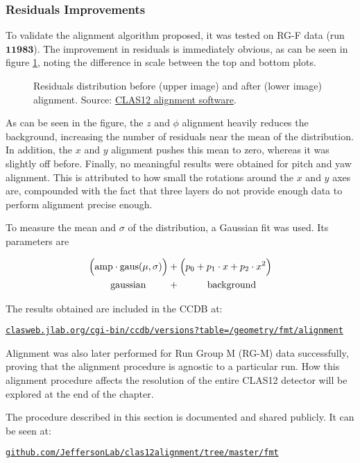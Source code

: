 \subsubsection{Residuals Improvements}
    To validate the alignment algorithm proposed, it was tested on RG-F data (run $\mathbf{11983}$).
    The improvement in residuals is immediately obvious, as can be seen in figure \ref{fig::res_comparison}, noting the difference in scale between the top and bottom plots.

    \begin{figure}[t!]
        \centering{}
        \caption[Residuals distribution improvement.]{Residuals distribution before (upper image) and after (lower image) alignment.
        Source: \hyperlink{github.com/JeffersonLab/clas12alignment}{CLAS12 alignment software}.}
        \label{fig::res_comparison}
    \end{figure}

    As can be seen in the figure, the $z$ and $\phi$ alignment heavily reduces the background, increasing the number of residuals near the mean of the distribution.
    In addition, the $x$ and $y$ alignment pushes this mean to zero, whereas it was slightly off before.
    Finally, no meaningful results were obtained for pitch and yaw alignment.
    This is attributed to how small the rotations around the $x$ and $y$ axes are, compounded with the fact that three layers do not provide enough data to perform alignment precise enough.

    To measure the mean and $\sigma$ of the distribution, a Gaussian fit was used.
    Its parameters are

     \begin{align*}
        \Big( \text{amp} \cdot \text{gaus}(\mu, \sigma) \Big) &+ \Big( p_0 + p_1\cdot x + p_2\cdot x^2 \Big) \\
        \text{gaussian} \hspace{0.8cm} &+ \hspace{1cm} \text{background}
    \end{align*}

    The results obtained are included in the CCDB at:

    \small\href{clasweb.jlab.org/cgi-bin/ccdb/versions?table=/geometry/fmt/alignment}{\texttt{clasweb.jlab.org/cgi-bin/ccdb/versions?table=/geometry/fmt/alignment}}

    Alignment was also later performed for Run Group M (RG-M) data successfully, proving that the alignment procedure is agnostic to a particular run.
    How this alignment procedure affects the resolution of the entire CLAS12 detector will be explored at the end of the chapter.

    The procedure described in this section is documented and shared publicly.
    It can be seen at:

    \href{github.com/JeffersonLab/clas12alignment/tree/master/fmt}{\texttt{github.com/JeffersonLab/clas12alignment/tree/master/fmt}}
